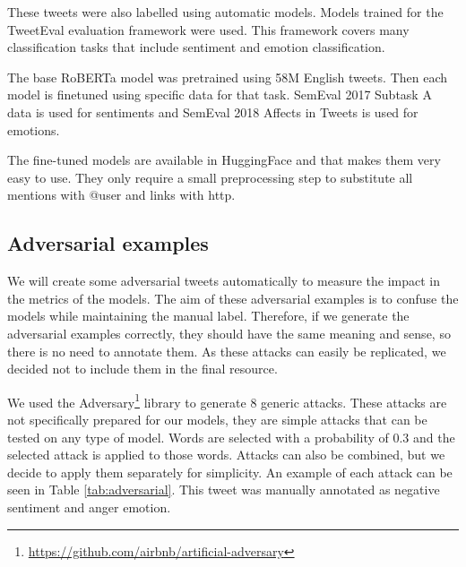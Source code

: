 \documentclass[11pt,a4paper]{article}
\begin{document}
These tweets were also labelled using automatic models. Models trained for the TweetEval \cite{barbieri-etal-2020-tweeteval} evaluation framework were used. This framework covers many classification tasks that include sentiment and emotion classification. 

The base RoBERTa \cite{liu2019roberta} model was pretrained using 58M English tweets. Then each model is finetuned using specific data for that task. SemEval 2017 Subtask A data \cite{rosenthal2019semeval} is used for sentiments and SemEval 2018 Affects in Tweets \cite{mohammad-etal-2018-semeval} is used for emotions.

The fine-tuned models are available in HuggingFace and that makes them very easy to use. They only require a small preprocessing step to substitute all mentions with @user and links with http.

\subsection{Adversarial examples}

We will create some adversarial tweets automatically to measure the impact in the metrics of the models. The aim of these adversarial examples is to confuse the models while maintaining the manual label. Therefore, if we generate the adversarial examples correctly, they should have the same meaning and sense, so there is no need to annotate them. As these attacks can easily be replicated, we decided not to include them in the final resource.

We used the Adversary\footnote{\url{https://github.com/airbnb/artificial-adversary}} library to generate 8 generic attacks. These attacks are not specifically prepared for our models, they are simple attacks that can be tested on any type of model. Words are selected with a probability of 0.3 and the selected attack is applied to those words. Attacks can also be combined, but we decide to apply them separately for simplicity. An example of each attack can be seen in Table \ref{tab:adversarial}. This tweet was manually annotated as negative sentiment and anger emotion.
\end{document}
